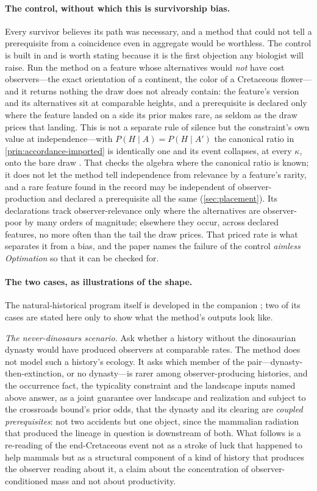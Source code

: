 \documentclass[11pt]{article}
\theoremstyle{definition}
\begin{document}
\paragraph{The control, without which this is survivorship bias.} Every survivor believes its path was necessary, and a method that could not tell a prerequisite from a coincidence even in aggregate would be worthless. The control is built in and is worth stating because it is the first objection any biologist will raise. Run the method on a feature whose alternatives would \emph{not} have cost observers---the exact orientation of a continent, the color of a Cretaceous flower---and it returns nothing the draw does not already contain: the feature's version and its alternatives sit at comparable heights, and a prerequisite is declared only where the feature landed on a side its prior makes rare, as seldom as the draw prices that landing. This is not a separate rule of silence but the constraint's own value at independence---with $P(H \mid A) = P(H \mid A')$ the canonical ratio in \autoref{prin:accordance-imported} is identically one and its event collapses, at every $\kappa$, onto the bare draw \cite{Nexus}. That checks the algebra where the canonical ratio is known; it does not let the method tell independence from relevance by a feature's rarity, and a rare feature found in the record may be independent of observer-production and declared a prerequisite all the same (\autoref{sec:placement}). Its declarations track observer-relevance only where the alternatives are observer-poor by many orders of magnitude; elsewhere they occur, across declared features, no more often than the tail the draw prices. That priced rate is what separates it from a bias, and the paper names the failure of the control \emph{aimless Optimation} so that it can be checked for.

\paragraph{The two cases, as illustrations of the shape.} The natural-historical program itself is developed in the companion \cite{Nexus}; two of its cases are stated here only to show what the method's outputs look like.

\emph{The never-dinosaurs scenario.} Ask whether a history without the dinosaurian dynasty would have produced observers at comparable rates. The method does not model such a history's ecology. It asks which member of the pair---dynasty-then-extinction, or no dynasty---is rarer among observer-producing histories, and the occurrence fact, the typicality constraint and the landscape inputs named above answer, as a joint guarantee over landscape and realization and subject to the crossroads bound's prior odds, that the dynasty and its clearing are \emph{coupled prerequisites}: not two accidents but one object, since the mammalian radiation that produced the lineage in question is downstream of both. What follows is a re-reading of the end-Cretaceous event not as a stroke of luck that happened to help mammals but as a structural component of a kind of history that produces the observer reading about it, a claim about the concentration of observer-conditioned mass and not about productivity.
\end{document}
